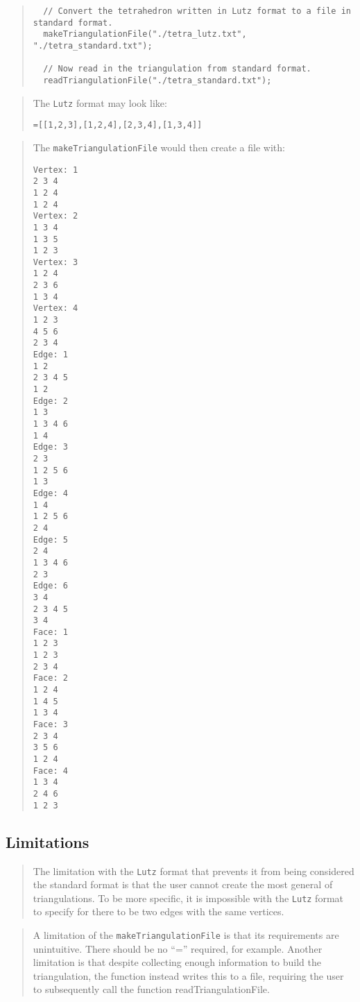 \documentclass[10pt]{article}%
\begin{document}
\begin{quotation} {\small{\begin{verbatim} 
  // Convert the tetrahedron written in Lutz format to a file in standard format.
  makeTriangulationFile("./tetra_lutz.txt", "./tetra_standard.txt");
  
  // Now read in the triangulation from standard format.
  readTriangulationFile("./tetra_standard.txt");
  \end{verbatim}
}}
\end{quotation}\begin{quotation} The \texttt{Lutz} format may look like:{\small{\begin{verbatim} 
=[[1,2,3],[1,2,4],[2,3,4],[1,3,4]]
  \end{verbatim}
}}
\end{quotation}\begin{quotation} The \texttt{makeTriangulationFile} would then create a file with:{\small{\begin{verbatim} 
Vertex: 1
2 3 4 
1 2 4 
1 2 4 
Vertex: 2
1 3 4 
1 3 5 
1 2 3 
Vertex: 3
1 2 4 
2 3 6 
1 3 4 
Vertex: 4
1 2 3 
4 5 6 
2 3 4 
Edge: 1
1 2
2 3 4 5 
1 2 
Edge: 2
1 3
1 3 4 6 
1 4 
Edge: 3
2 3
1 2 5 6 
1 3 
Edge: 4
1 4
1 2 5 6 
2 4 
Edge: 5
2 4
1 3 4 6 
2 3 
Edge: 6
3 4
2 3 4 5 
3 4 
Face: 1
1 2 3 
1 2 3 
2 3 4 
Face: 2
1 2 4 
1 4 5 
1 3 4 
Face: 3
2 3 4 
3 5 6 
1 2 4 
Face: 4
1 3 4 
2 4 6 
1 2 3 
  \end{verbatim}
}}
\end{quotation}
\subsection*{Limitations}

\begin{quotation} The limitation with the \texttt{Lutz} format that prevents it from being considered the standard format is that the user cannot create the most general of triangulations. To be more specific, it is impossible with the \texttt{Lutz} format to specify for there to be two edges with the same vertices.\end{quotation}
\begin{quotation} A limitation of the \texttt{makeTriangulationFile} is that its requirements are unintuitive. There should be no ``='' required, for example. Another limitation is that despite collecting enough information to build the triangulation, the function instead writes this to a file, requiring the user to subsequently call the function readTriangulationFile.\end{quotation}
\end{document}
